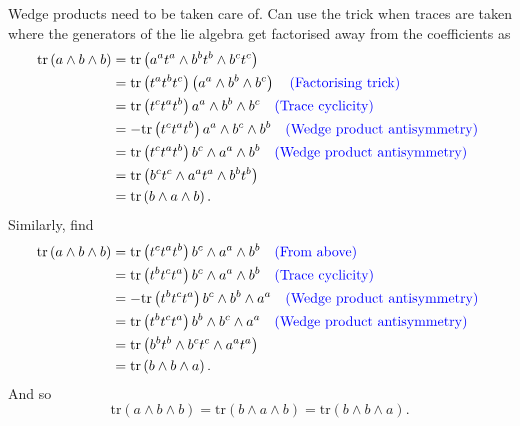 \documentclass{article}
\begin{document}
\noindent Wedge products need to be taken care of. Can use the trick when traces are taken where the generators of the lie algebra get factorised away from the coefficients as 
\begin{align}
    \text{tr}\left(a\wedge b\wedge b \right)&= \text{tr}\left(a^{a}t^{a}\wedge b^{b}t^{b}\wedge b^{c}t^{c} \right)\nonumber \\
    &= \text{tr}\left(t^{a}t^{b}t^{c} \right)\left(a^{a}\wedge b^{b}\wedge b^{c} \right)\nonumber\quad \text{\color{blue}(Factorising trick) \color{black}}\\
    &= \text{tr}\left(t^{c}t^{a}t^{b} \right)a^{a}\wedge b^{b}\wedge b^{c} \nonumber\quad \text{\color{blue}(Trace cyclicity) \color{black}}\\
    &= -\text{tr}\left(t^{c}t^{a}t^{b} \right)a^{a}\wedge b^{c}\wedge b^{b} \nonumber\quad \text{\color{blue}(Wedge product antisymmetry) \color{black}}\\
    &= \text{tr}\left(t^{c}t^{a}t^{b} \right)b^{c}\wedge a^{a}\wedge b^{b} \nonumber\quad \text{\color{blue}(Wedge product antisymmetry) \color{black}}\\
    &=\text{tr}\left(b^{c}t^{c}\wedge a^{a}t^{a}\wedge b^{b}t^{b} \right)\nonumber \\
    &=  \text{tr}\left(b\wedge a\wedge b \right).
\end{align}
Similarly, find 
\begin{align}
    \text{tr}\left(a\wedge b\wedge b \right)&= \text{tr}\left(t^{c}t^{a}t^{b} \right)b^{c}\wedge a^{a}\wedge b^{b} \nonumber\nonumber\quad \text{\color{blue}(From above) \color{black}}\\
    &= \text{tr}\left(t^{b}t^{c}t^{a}\right)b^{c}\wedge a^{a}\wedge b^{b} \nonumber\quad \text{\color{blue}(Trace cyclicity) \color{black}}\\
    &= - \text{tr}\left(t^{b}t^{c}t^{a}\right)b^{c}\wedge b^{b}\wedge a^{a} \nonumber\quad \text{\color{blue}(Wedge product antisymmetry) \color{black}}\\
    &= \text{tr}\left(t^{b}t^{c}t^{a}\right) b^{b}\wedge b^{c}\wedge a^{a} \nonumber\quad \text{\color{blue}(Wedge product antisymmetry) \color{black}}\\
    &= \text{tr}\left(b^{b}t^{b}\wedge b^{c}t^{c}\wedge a^{a}t^{a}\right)\\
    &= \text{tr}\left(b\wedge b \wedge a \right).
\end{align}
And so
\begin{equation}
    \label{Eq: Trace result}
    \boxed{
    \text{tr}\left(a\wedge b \wedge b\right) = \text{tr}\left(b\wedge a \wedge b\right) = \text{tr}
    \left(b\wedge b \wedge a\right).
    }
\end{equation}
\end{document}
